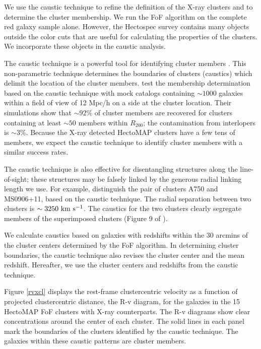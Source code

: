 \documentclass[iop, apj]{emulateapj}
\newcommand{\kms}{\rm km~s^{-1}}
\begin{document}
We use the caustic technique to refine 
 the definition of the X-ray clusters
 and to determine the cluster membership. 
We run the FoF algorithm on the complete red galaxy sample alone. 
However, the Hectospec survey contains many objects 
 outside the color cuts 
 that are useful for calculating the properties of the clusters. 
We incorporate these objects in the caustic analysis.
  
The caustic technique is a powerful tool for identifying cluster members 
 \citep{Diaferio97, Diaferio99b, Serra13}.
This non-parametric technique determines the boundaries of clusters (caustics)
 which delimit the location of the cluster members. 
\citet{Serra13} test the membership determination based on the caustic technique 
 with mock catalogs containing $\sim1000$ galaxies 
 within a field of view of 12 Mpc/h on a side at the cluster location. 
Their simulations show that $\sim 92\%$ of cluster members are recovered for clusters containing 
 at least $\sim 50$ members within $R_{200}$;
 the contamination from interlopers is $\sim 3\%$. 
Because the X-ray detected HectoMAP clusters have a few tens of members, 
 we expect the caustic technique to identify cluster members 
 with a similar success rates. 

The caustic technique is also effective 
 for disentangling structures along the line-of-sight; 
 these structures may be falsely linked by the generous radial linking length we use. 
For example,
 \citet{Rines13} distinguish the pair of clusters
 A750 and MS0906+11, based on the caustic technique.
The radial separation between two clusters is $\sim3250~\kms$. 
The caustics for the two clusters clearly segregate members of the superimposed clusters
 (Figure 9 of \citealp{Rines13}). 

We calculate caustics based on galaxies with redshifts
 within the 30 arcmins of the cluster centers determined by the FoF algorithm. 
In determining cluster boundaries, 
 the caustic technique also revises the cluster center and 
 the mean redshift. 
Hereafter, we use the cluster centers and redshifts 
 from the caustic technique. 

Figure \ref{rvxcl} displays 
 the rest-frame clustercentric velocity
 as a function of projected clustercentric distance, 
 the R-v diagram, for the galaxies in the 15 HectoMAP FoF clusters with X-ray counterparts. 
The R-v diagrams show clear concentrations around 
 the center of each cluster.
The solid lines in each panel 
 mark the boundaries of the clusters identified by the caustic technique. 
The galaxies within these caustic patterns are cluster members. 
\end{document}
